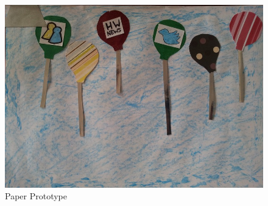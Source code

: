 \begin{figure}[h]
\begin{centering}
\includegraphics[width=\textwidth]{Diagrams/PaperPrototype.jpg}
\par\end{centering}

\caption{Paper Prototype}
\label{PaperPrototype}
\end{figure}
